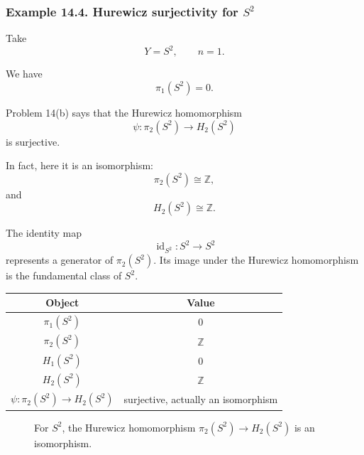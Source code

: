 \documentclass[12pt,a4paper]{article}
\theoremstyle{notespace}
\begin{document}
\subsubsection*{Example 14.4. Hurewicz surjectivity for \(S^2\)}

Take
\[
Y=S^2,
\qquad
n=1.
\]

We have
\[
\pi_1(S^2)=0.
\]

Problem 14(b) says that the Hurewicz homomorphism
\[
\psi:\pi_2(S^2)\to H_2(S^2)
\]
is surjective.

In fact, here it is an isomorphism:
\[
\pi_2(S^2)\cong \mathbb Z,
\]
and
\[
H_2(S^2)\cong \mathbb Z.
\]

The identity map
\[
\operatorname{id}_{S^2}:S^2\to S^2
\]
represents a generator of \(\pi_2(S^2)\). Its image under the Hurewicz homomorphism is the fundamental class of \(S^2\).

\begin{center}
	\renewcommand{\arraystretch}{1.25}
	\begin{tabular}{c|c}
		\textbf{Object} & \textbf{Value}\\
		\hline
		\(\pi_1(S^2)\) & \(0\)\\
		\(\pi_2(S^2)\) & \(\mathbb Z\)\\
		\(H_1(S^2)\) & \(0\)\\
		\(H_2(S^2)\) & \(\mathbb Z\)\\
		\(\psi:\pi_2(S^2)\to H_2(S^2)\) & surjective, actually an isomorphism
	\end{tabular}
\end{center}

\begin{figure}[htbp]
	\centering
	\caption{For \(S^2\), the Hurewicz homomorphism \(\pi_2(S^2)\to H_2(S^2)\) is an isomorphism.}
\end{figure}
\end{document}
